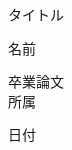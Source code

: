 \documentclass[a4paper,12pt]{ltjsreport}
\begin{document}
\begin{titlepage}
  \begin{center}
  
  \vspace*{2cm}
  
  \begin{LARGE}
  タイトル
  \end{LARGE}
  
  \vspace*{4cm}
  
  \begin{Large}
  名前\\
  
  \vspace*{3cm}
  
  卒業論文\\
  所属\\
  
  \vspace*{2cm}
  
  日付\\
  \end{Large}
  \end{center}
  \end{titlepage}
\end{document}
